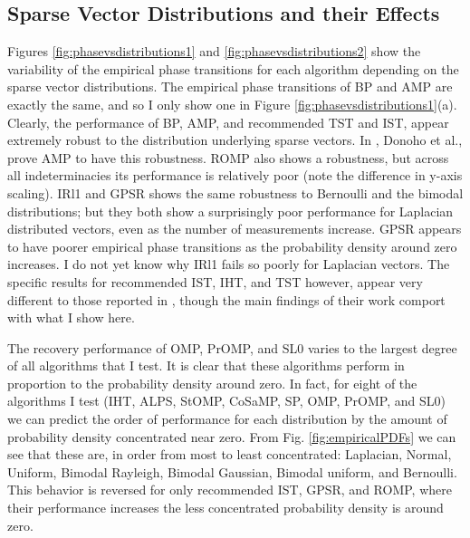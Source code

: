 \documentclass[11pt,draftcls,onecolumn]{IEEEtran}
\begin{document}
\subsection{Sparse Vector Distributions and their Effects}
Figures \ref{fig:phasevsdistributions1} and \ref{fig:phasevsdistributions2}
show the variability of the empirical phase transitions for each algorithm
depending on the sparse vector distributions.
The empirical phase transitions of BP and AMP are exactly the same,
and so I only show one in Figure \ref{fig:phasevsdistributions1}(a).
Clearly, the performance of BP, AMP, and recommended TST and IST, 
appear extremely robust  to the distribution underlying sparse vectors.
In \cite{Donoho2009}, Donoho et al., prove AMP to have this robustness.
ROMP also shows a robustness,
but across all indeterminacies its performance
is relatively poor (note the difference in y-axis scaling).
IRl1 and GPSR shows the same robustness to 
Bernoulli and the bimodal distributions;
but they both show a surprisingly poor performance 
for Laplacian distributed vectors, even as the number of measurements increase.
GPSR appears to have poorer empirical phase transitions
as the probability density around zero increases.
I do not yet know why IRl1 fails so poorly for Laplacian vectors.
The specific results for recommended IST, IHT, and TST however, appear very different
to those reported in \cite{Maleki2010},
though the main findings of their work comport with what I show here.

The recovery performance of OMP, PrOMP, and SL0 
varies to the largest degree of all algorithms that I test.
It is clear that these algorithms perform in proportion to
the probability density around zero.
In fact, for eight of the algorithms I test (IHT, ALPS, StOMP, CoSaMP,
SP, OMP, PrOMP, and SL0) we can predict the order of performance
for each distribution by the amount of probability density 
concentrated near zero.
From Fig. \ref{fig:empiricalPDFs} we can see that
these are, in order from most to least concentrated:
Laplacian, Normal, Uniform, 
Bimodal Rayleigh, Bimodal Gaussian, 
Bimodal uniform, and Bernoulli.
This behavior is reversed for only recommended IST, GPSR, and ROMP,
where their performance increases 
the less concentrated probability density is around zero.
\end{document}
